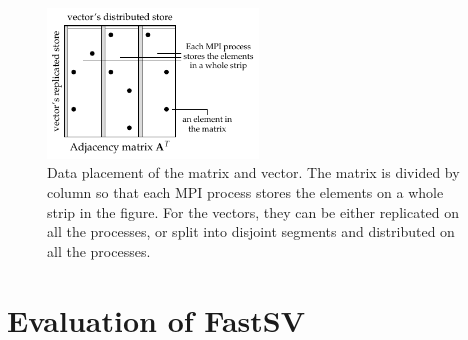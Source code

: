 \documentclass{sokendai_thesis} %
\newcommand{\boruvka}[0]{Boruvka}
\begin{document}
\begin{figure}
\centering
\includegraphics[width=0.5\textwidth]{figures/spmat.pdf}
\caption{Data placement of the matrix and vector.
The matrix is divided by column so that each MPI process stores the elements on a whole strip in the figure. For the vectors, they can be either replicated on all the processes, or split into disjoint segments and distributed on all the processes.}
\vspace{-8pt}
\label{fig:spmat}
\end{figure}

\section{Evaluation of FastSV}
\label{sec:fastsv-evaluation}
\end{document}
